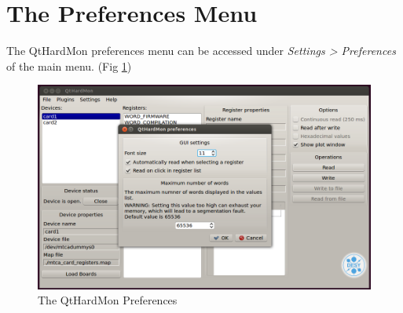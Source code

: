 \begin{enumerate}

\end{enumerate}


\section{The Preferences Menu}\label{preference_section}
The QtHardMon preferences menu can be accessed under \textit{Settings > Preferences} of the main menu. (Fig \ref{qthardmon_preferences})

\begin{figure}[htbp]
\centering
\includegraphics[width=1\textwidth]{images/preferences.png}
 \caption{The QtHardMon Preferences}
\label{qthardmon_preferences}			
\end{figure}

